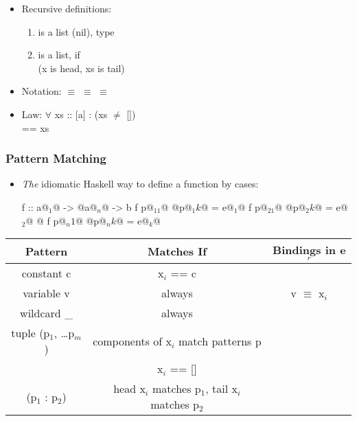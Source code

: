 \begin{itemize}
  \item Recursive definitions:
  \begin{enumerate}
      \item \codeline{[]} is a list (nil), type \codeline{[] :: [a]}
      \item {} is a list, if \\
      (x is head, xs is tail)
  \end{enumerate}
  \item Notation:  $\equiv$  $\equiv$ \codeline{[3,2,1]} $\equiv$ 
  \item Law: $\forall$ xs :: [a] :   \hspace{1cm} (xs $\neq$ []) \\
       == xs
\end{itemize}

\subsubsection{Pattern Matching}

\begin{itemize}
  \item \textit{The} idiomatic Haskell way to define a function by cases:\\
  \begin{Haskell}
f :: a@$_1$@ -> @\dots@ a@$_n$@ -> b
f p@$_11$@ @\dots@ p@$_1k$@ = e@$_1$@
f p@$_21$@ @\dots@ p@$_2k$@ = e@$_2$@
@\dots@
f p@$_n1$@ @\dots@ p@$_nk$@ = e@$_k$@
  \end{Haskell}

\end{itemize}
\begin{center}
\begin{tabular}{|c|c|c|}\hline
\rowcolor{grau}   
Pattern         & Matches If                & Bindings in e$_r$     \\\hline
  constant c      & x$_i$ == c                  &                     \\\hline
  variable v      & always                    & v $\equiv$ x$_i$      \\\hline
  wildcard \_      & always                    &                       \\\hline
  tuple (p$_1$, \dots p$_m$)  & components of x$_i$ match patterns p    & \\\hline
  []              & x$_i$ == []                 &                     \\\hline
  (p$_1$ : p$_2$)     & head x$_i$ matches p$_1$, tail x$_i$ matches p$_2$    & \\\hline
\end{tabular}
\end{center}

